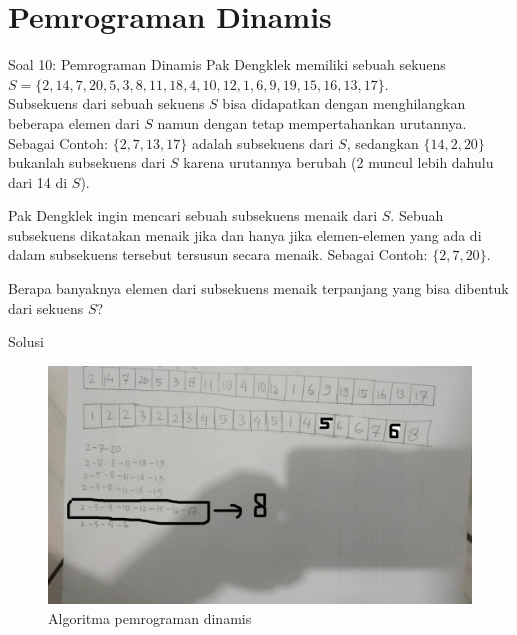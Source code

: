 \documentclass[english,t]{beamer}
\begin{document}
\section{Pemrograman Dinamis}
\begin{frame}{Soal 10: Pemrograman Dinamis}
Pak Dengklek memiliki sebuah sekuens $S = \{2, 14, 7, 20, 5, 3, 8, 11, 18, 4, 10, 12, 1, 6, 9, 19, 15, 16, 13, 17\}$. \\
Subsekuens dari sebuah sekuens $S$ bisa didapatkan dengan menghilangkan beberapa elemen dari $S$ namun dengan tetap mempertahankan urutannya. Sebagai Contoh: $\{2, 7, 13, 17\}$ adalah subsekuens dari $S$, sedangkan $\{14, 2, 20\}$ bukanlah subsekuens dari $S$ karena urutannya berubah (2 muncul lebih dahulu dari 14 di $S$).

\bigskip
Pak Dengklek ingin mencari sebuah subsekuens menaik dari $S$. Sebuah subsekuens dikatakan menaik jika dan hanya jika elemen-elemen yang ada di dalam subsekuens tersebut tersusun secara menaik. Sebagai Contoh: $\{2, 7, 20\}$. 

\bigskip
Berapa banyaknya elemen dari subsekuens menaik terpanjang yang bisa dibentuk dari sekuens $S$?
\end{frame}

\begin{frame}{Solusi}
\begin{figure}[!ht]
\centering
\includegraphics[scale=.25]{images/solusi-soal-10}
\caption{Algoritma pemrograman dinamis \citep{bang2022lsi}}
\end{figure}
\end{frame}



\end{document}
